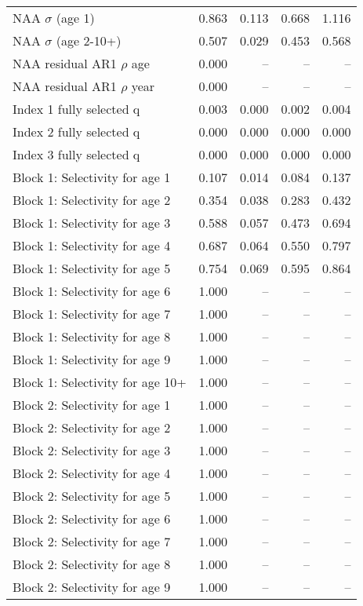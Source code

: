 \documentclass[
]{article}
\begin{document}
\begin{landscape}
\begin{longtable}[t]{lrrrr}
\endfoot
\bottomrule
\endlastfoot
NAA $\sigma$ (age 1) & 0.863 & 0.113 & 0.668 & 1.116\\
NAA $\sigma$ (age 2-10+) & 0.507 & 0.029 & 0.453 & 0.568\\
NAA residual AR1 $\rho$ age & 0.000 & -- & -- & --\\
NAA residual AR1 $\rho$ year & 0.000 & -- & -- & --\\
Index 1 fully selected q & 0.003 & 0.000 & 0.002 & 0.004\\
\addlinespace
Index 2 fully selected q & 0.000 & 0.000 & 0.000 & 0.000\\
Index 3 fully selected q & 0.000 & 0.000 & 0.000 & 0.000\\
Block 1: Selectivity for age 1 & 0.107 & 0.014 & 0.084 & 0.137\\
Block 1: Selectivity for age 2 & 0.354 & 0.038 & 0.283 & 0.432\\
Block 1: Selectivity for age 3 & 0.588 & 0.057 & 0.473 & 0.694\\
\addlinespace
Block 1: Selectivity for age 4 & 0.687 & 0.064 & 0.550 & 0.797\\
Block 1: Selectivity for age 5 & 0.754 & 0.069 & 0.595 & 0.864\\
Block 1: Selectivity for age 6 & 1.000 & -- & -- & --\\
Block 1: Selectivity for age 7 & 1.000 & -- & -- & --\\
Block 1: Selectivity for age 8 & 1.000 & -- & -- & --\\
\addlinespace
Block 1: Selectivity for age 9 & 1.000 & -- & -- & --\\
Block 1: Selectivity for age 10+ & 1.000 & -- & -- & --\\
Block 2: Selectivity for age 1 & 1.000 & -- & -- & --\\
Block 2: Selectivity for age 2 & 1.000 & -- & -- & --\\
Block 2: Selectivity for age 3 & 1.000 & -- & -- & --\\
\addlinespace
Block 2: Selectivity for age 4 & 1.000 & -- & -- & --\\
Block 2: Selectivity for age 5 & 1.000 & -- & -- & --\\
Block 2: Selectivity for age 6 & 1.000 & -- & -- & --\\
Block 2: Selectivity for age 7 & 1.000 & -- & -- & --\\
Block 2: Selectivity for age 8 & 1.000 & -- & -- & --\\
\addlinespace
Block 2: Selectivity for age 9 & 1.000 & -- & -- & --\\

\end{longtable}
\end{landscape}
\end{document}
